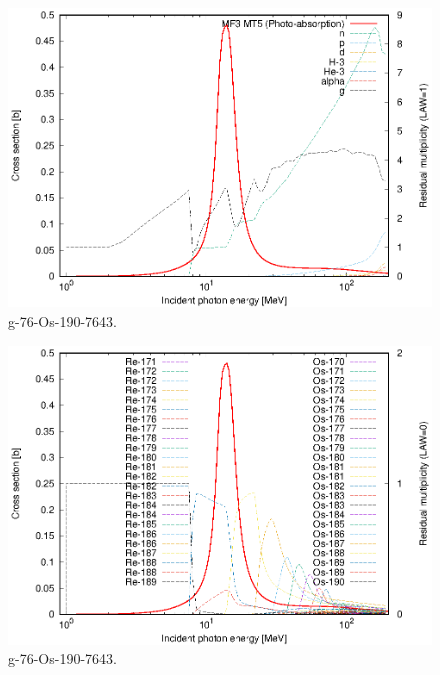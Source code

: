 \begin{figure}
 \includegraphics[width=\linewidth]{eps/g_76-Os-190_7643.eps}
  \caption{g-76-Os-190-7643.}
\end{figure}
\begin{figure}
 \includegraphics[width=\linewidth]{eps-law0/g_76-Os-190_7643.eps}
 \caption{g-76-Os-190-7643.}
\end{figure}
\newpage \clearpage

